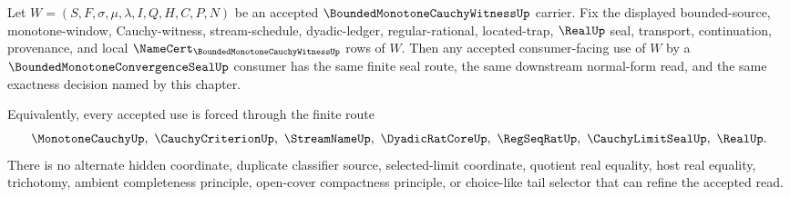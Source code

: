 \begin{corollary}
\label{cor:bounded-monotone-cauchy-witness-convergence-seal-consumer-determinacy}
Let $W=(S,F,\sigma,\mu,\lambda,I,Q,H,C,P,N)$ be an accepted $\BoundedMonotoneCauchyWitnessUp$ carrier. Fix the displayed bounded-source, monotone-window, Cauchy-witness, stream-schedule, dyadic-ledger, regular-rational, located-trap, $\RealUp$ seal, transport, continuation, provenance, and local $\NameCert_{\BoundedMonotoneCauchyWitnessUp}$ rows of $W$. Then any accepted consumer-facing use of $W$ by a $\BoundedMonotoneConvergenceSealUp$ consumer has the same finite seal route, the same downstream normal-form read, and the same exactness decision named by this chapter.

Equivalently, every accepted use is forced through the finite route
$$
\MonotoneCauchyUp,\ \CauchyCriterionUp,\ \StreamNameUp,\ \DyadicRatCoreUp,\ \RegSeqRatUp,\ \CauchyLimitSealUp,\ \RealUp .
$$
There is no alternate hidden coordinate, duplicate classifier source, selected-limit coordinate, quotient real equality, host real equality, trichotomy, ambient completeness principle, open-cover compactness principle, or choice-like tail selector that can refine the accepted read.
\end{corollary}

